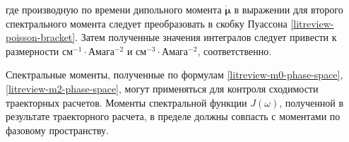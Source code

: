 \documentclass[12pt]{article}
\newcommand{\bs}{\boldsymbol}
\begin{document}
%
где производную по времени дипольного момента $\dot{\bs{\mu}}$ в выражении для второго спектрального момента следует преобразовать в скобку Пуассона \eqref{litreview-poisson-bracket}. Затем полученные значения интегралов следует привести к размерности см$^{-1} \cdot$Амага$^{-2}$ и  см$^{-3} \cdot$Амага$^{-2}$, соответственно. \par
Спектральные моменты, полученные по формулам \eqref{litreview-m0-phase-space}, \eqref{litreview-m2-phase-space}, могут применяться для контроля сходимости траекторных расчетов. Моменты спектральной функции $J(\omega)$, полученной в результате траекторного расчета, в пределе должны совпасть с моментами по фазовому пространству.

\newpage
\printbibliography
\end{document}
